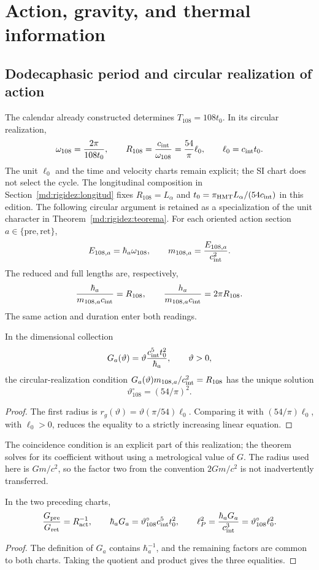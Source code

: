 \section{Action, gravity, and thermal information}
\label{sec:gravity}
\subsection{Dodecaphasic period and circular realization of action}
The calendar already constructed determines $T_{108}=108t_0$.
In its circular realization,
\[
\omega_{108}=\frac{2\pi}{108t_0},\qquad
R_{108}=\frac{c_{\rm int}}{\omega_{108}}
=\frac{54}{\pi}\ell_0,\qquad \ell_0=c_{\rm int}t_0.
\]
The unit $\ell_0$ and the time and velocity charts remain
explicit; the SI chart does not select the cycle.
The longitudinal composition in Section~\ref{md:rigidez:longitud}
fixes $R_{108}=L_\alpha$ and
$t_0=\pi_{\rm HMT}L_\alpha/(54c_{\rm int})$ in this edition.
The following circular argument is retained as a specialization
of the unit character in Theorem~\ref{md:rigidez:teorema}.
For each oriented action section $a\in\{\mathrm{pre},\mathrm{ret}\}$,
\[
E_{108,a}=\hbar_a\omega_{108},\qquad
m_{108,a}=\frac{E_{108,a}}{c_{\rm int}^2}.
\]
The reduced and full lengths are, respectively,
\[
\frac{\hbar_a}{m_{108,a}c_{\rm int}}=R_{108},
\qquad
\frac{h_a}{m_{108,a}c_{\rm int}}=2\pi R_{108}.
\]
The same action and duration enter both readings.

\begin{proposition}
In the dimensional collection
\[
G_a(\vartheta)=\vartheta\frac{c_{\rm int}^5t_0^2}{\hbar_a},
\qquad \vartheta>0,
\]
the circular-realization condition
$G_a(\vartheta)m_{108,a}/c_{\rm int}^2=R_{108}$
has the unique solution
\[
\vartheta^\circ_{108}=(54/\pi)^2.
\]
\end{proposition}
\begin{proof}
The first radius is
$r_g(\vartheta)=\vartheta(\pi/54)\ell_0$.
Comparing it with $(54/\pi)\ell_0$, with $\ell_0>0$, reduces the
equality to a strictly increasing linear equation.
\end{proof}
The coincidence condition is an explicit part of this realization;
the theorem solves for its coefficient without using a metrological value of $G$.
The radius used here is $Gm/c^2$, so the factor two from
the convention $2Gm/c^2$ is not inadvertently transferred.

\begin{proposition}
In the two preceding charts,
\[
\frac{G_{\rm pre}}{G_{\rm ret}}=R_{\rm act}^{-1},\qquad
\hbar_aG_a=\vartheta^\circ_{108}c_{\rm int}^5t_0^2,
\qquad
\ell_P^2=\frac{\hbar_aG_a}{c_{\rm int}^3}
=\vartheta^\circ_{108}\ell_0^2.
\]
\end{proposition}
\begin{proof}
The definition of $G_a$ contains $\hbar_a^{-1}$, and the remaining factors
are common to both charts. Taking the quotient and product gives
the three equalities.
\end{proof}
